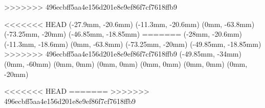\SetVerticalCoffin \headingText{160mm}{\center\heiti\fontsize{36}{36}\textcolor{black}{本科生毕业论文}}
\SetVerticalCoffin {}
\fontsize{22pt}{22pt}\selectfont
\SetVerticalCoffin \chineseTitleText{110mm}{\bfseries\kaiti\underline{\makebox[112mm][l]{\chineseTitle}}}
\fontsize{16pt}{16pt}\selectfont
\SetVerticalCoffin \englishTitleText{110mm}{\bfseries\underline{\makebox[112mm][l]{\englishTitle}}}
\SetVerticalCoffin {}
\SetVerticalCoffin {}
>>>>>>> 496ecbff5aa4e156d201e8e9ef86f7cf7618ffb9
\SetVerticalCoffin {}
\SetVerticalCoffin {}
\SetVerticalCoffin {}
\fontsize{18}{18}\selectfont
\SetVerticalCoffin \dateText{104mm}{\center\kaiti\textcolor{black}{二〇一玖\quad 年\quad 五\quad 月}}


\JoinCoffins \result \topBox
<<<<<<< HEAD
\JoinCoffins {} \badge[r, b](-27.9mm, -20.6mm)
\JoinCoffins {} \pku[l, b](-11.3mm, -20.6mm)
\JoinCoffins {} \headingText[hc, b](0mm, -63.8mm)
\JoinCoffins {} \titleText[l, t](-73.25mm, -20mm)
\JoinCoffins {} \chineseTitleText[l, t](-46.85mm, -18.85mm)
=======
\JoinCoffins {} \badge[r, b](-28mm, -20.6mm)
\JoinCoffins {} \pku[l, b](-11.3mm, -18.6mm)
\JoinCoffins {} \headingText[hc, b](0mm, -63.8mm)
\JoinCoffins {} \titleText[l, t](-73.25mm, -20mm)
\JoinCoffins {} \chineseTitleText[l, t](-49.85mm, -18.85mm)
>>>>>>> 496ecbff5aa4e156d201e8e9ef86f7cf7618ffb9
\JoinCoffins {} \englishTitleText[l, t](-49.85mm, -34mm)
\JoinCoffins {} \nameText[hc, t](0mm, -60mm)
\JoinCoffins {} \studentIDText[hc, t](0mm, 0mm)
\JoinCoffins {} \schoolText[hc, t](0mm, 0mm)
\JoinCoffins {} \majorText[hc, t](0mm, 0mm)
\JoinCoffins {} \advisorText[hc, t](0mm, 0mm)
\JoinCoffins {} \dateText[hc, t](0mm, -20mm)


\thispagestyle{empty}
\noindent\TypesetCoffin \result
<<<<<<< HEAD
\restoregeometry
=======
\restoregeometry
>>>>>>> 496ecbff5aa4e156d201e8e9ef86f7cf7618ffb9
